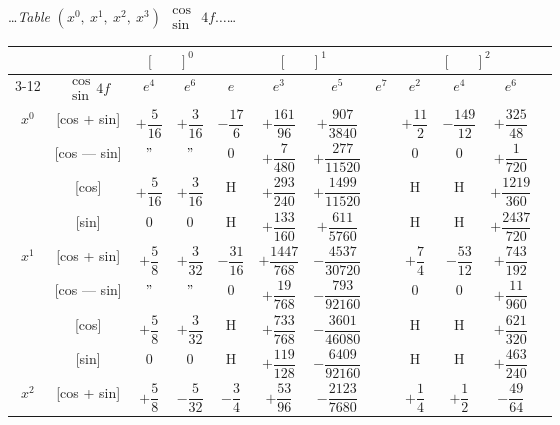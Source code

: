 \documentclass[10pt,a4paper]{article}
\newcommand{\tabletitle}[2]{%
  \begin{center}
  \ldots\textit{Table} #1 $\displaystyle\begin{smallmatrix} \cos \\ \sin \end{smallmatrix}$ #2\ldots
  \end{center}
}
\begin{document}
\vspace{1em}

\newpage
\tabletitle{$(x^0,\ x^1,\ x^2,\ x^3)$}{$4f\ldots$}

\begin{center}
\small
\begin{tabular}{|c|c|c|c|c|c|c|c|c|c|c|c|}
\hline
& & \multicolumn{2}{c|}{$[\phantom{()}]^0$} & \multicolumn{4}{c|}{$[\phantom{()}]^1$} & \multicolumn{3}{c|}{$[\phantom{()}]^2$} \\
\cline{3-12}
& $\begin{smallmatrix} \cos \\ \sin \end{smallmatrix} 4f$ & $e^4$ & $e^6$ & $e$ & $e^3$ & $e^5$ & $e^7$ & $e^2$ & $e^4$ & $e^6$ \\
\hline
\multirow{4}{*}{$x^0$} & [cos + sin] & $+\dfrac{5}{16}$ & $+\dfrac{3}{16}$ & $-\dfrac{17}{6}$ & $+\dfrac{161}{96}$ & $+\dfrac{907}{3840}$ & & $+\dfrac{11}{2}$ & $-\dfrac{149}{12}$ & $+\dfrac{325}{48}$ \\
& [cos --- sin] & $"$ & $"$ & $0$ & $+\dfrac{7}{480}$ & $+\dfrac{277}{11520}$ & & $0$ & $0$ & $+\dfrac{1}{720}$ \\
& [cos] & $+\dfrac{5}{16}$ & $+\dfrac{3}{16}$ & H & $+\dfrac{293}{240}$ & $+\dfrac{1499}{11520}$ & & H & H & $+\dfrac{1219}{360}$ \\
& [sin] & $0$ & $0$ & H & $+\dfrac{133}{160}$ & $+\dfrac{611}{5760}$ & & H & H & $+\dfrac{2437}{720}$ \\
\hline
\multirow{4}{*}{$x^1$} & [cos + sin] & $+\dfrac{5}{8}$ & $+\dfrac{3}{32}$ & $-\dfrac{31}{16}$ & $+\dfrac{1447}{768}$ & $-\dfrac{4537}{30720}$ & & $+\dfrac{7}{4}$ & $-\dfrac{53}{12}$ & $+\dfrac{743}{192}$ \\
& [cos --- sin] & $"$ & $"$ & $0$ & $+\dfrac{19}{768}$ & $-\dfrac{793}{92160}$ & & $0$ & $0$ & $+\dfrac{11}{960}$ \\
& [cos] & $+\dfrac{5}{8}$ & $+\dfrac{3}{32}$ & H & $+\dfrac{733}{768}$ & $-\dfrac{3601}{46080}$ & & H & H & $+\dfrac{621}{320}$ \\
& [sin] & $0$ & $0$ & H & $+\dfrac{119}{128}$ & $-\dfrac{6409}{92160}$ & & H & H & $+\dfrac{463}{240}$ \\
\hline
\multirow{4}{*}{$x^2$} & [cos + sin] & $+\dfrac{5}{8}$ & $-\dfrac{5}{32}$ & $-\dfrac{3}{4}$ & $+\dfrac{53}{96}$ & $-\dfrac{2123}{7680}$ & & $+\dfrac{1}{4}$ & $+\dfrac{1}{2}$ & $-\dfrac{49}{64}$ \\

\end{tabular}
\end{center}
\end{document}
